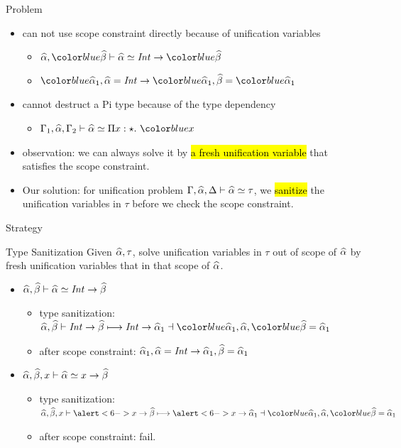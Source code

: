 \documentclass{beamer}
\begin{document}
\begin{frame}{Problem}
  \begin{itemize}
    \item can not use scope constraint directly because of unification variables
      \begin{itemize}
        \item $\genA, \hl{\genB} \byuni \genA \uni \Int \to \hl{\genB}$
        \item $\hl{\genA_1}, \genA = \Int \to \hl{\genA_1}, \genB = \hl{\genA_1}$
      \end{itemize}
    \item cannot destruct a Pi type because of the type dependency
      \begin{itemize}
      \item $\tctx_1, \genA, \tctx_2 \byuni \genA \uni \bpi x \star \hl{x}$
      \end{itemize}
    \item<2-> observation: we can always solve it by \hl{a fresh unification
      variable} that satisfies the scope constraint.
    \item<3-> Our solution:
        for unification problem
        $\Gamma, \widehat{\alpha}, \Delta \vdash \widehat{\alpha} \simeq \tau$,
        we \hl{sanitize} the unification variables in $\tau$ before we check the
        scope constraint.
  \end{itemize}
\end{frame}

\begin{frame}{Strategy}
  \begin{block}{Type Sanitization}
    Given $\widehat{\alpha}, \tau$, solve unification variables in $\tau$ out of scope of
    $\widehat{\alpha}$ by fresh unification variables that in that scope of $\widehat{\alpha}$.
  \end{block}
  \begin{itemize}
  \item<3-> $\widehat{\alpha}, \widehat{\beta} \vdash \widehat{\alpha} \simeq \mathit{Int} \to \widehat{\beta}$
    \begin{itemize}
      \item type sanitization: $\genA, \genB \bycg \Int \to \genB \cgto \Int \to
        \genA_1 \dashv \hl{\genA_1}, \genA, \hl{\genB = \genA_1}$
      \item after scope constraint: $\widehat{\alpha}_1, \widehat{\alpha} = \mathit{Int} \to \widehat{\alpha}_1, \widehat{\beta} = \widehat{\alpha}_1$
    \end{itemize}
  \item<4-> $\widehat{\alpha}, \widehat{\beta}, x \vdash \widehat{\alpha} \simeq x \to \widehat{\beta}$
    \begin{itemize}
      \item<5-> type sanitization: $\genA, \genB, x \bycg \alert<6->{x} \to \genB
        \cgto \alert<6->{x} \to
        \genA_1 \dashv \hl{\genA_1}, \genA, \hl{\genB = \genA_1}$
      \item<6-> after scope constraint: \alert{fail}.
    \end{itemize}
  \end{itemize}
\end{frame}
\end{document}
